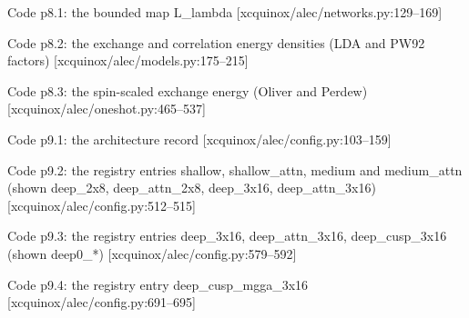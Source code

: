 \begin{frame}[allowframebreaks]{Code p8.1: the bounded map L\_lambda [xcquinox/alec/networks.py:129--169]}
\label{code:p8_1_the_bounded_map_l_lambda}
\end{frame}
\begin{frame}[allowframebreaks]{Code p8.2: the exchange and correlation energy densities (LDA and PW92 factors) [xcquinox/alec/models.py:175--215]}
\label{code:p8_2_the_exchange_and_correlation_energy_dens}
\end{frame}
\begin{frame}[allowframebreaks]{Code p8.3: the spin-scaled exchange energy (Oliver and Perdew) [xcquinox/alec/oneshot.py:465--537]}
\label{code:p8_3_the_spin_scaled_exchange_energy_oliver_a}
\end{frame}
\begin{frame}[allowframebreaks]{Code p9.1: the architecture record [xcquinox/alec/config.py:103--159]}
\label{code:p9_1_the_architecture_record}
\end{frame}
\begin{frame}[allowframebreaks]{Code p9.2: the registry entries shallow, shallow\_attn, medium and medium\_attn (shown deep\_2x8, deep\_attn\_2x8, deep\_3x16, deep\_attn\_3x16) [xcquinox/alec/config.py:512--515]}
\label{code:p9_2_the_registry_entries_shallow_shallow_att}
\end{frame}
\begin{frame}[allowframebreaks]{Code p9.3: the registry entries deep\_3x16, deep\_attn\_3x16, deep\_cusp\_3x16 (shown deep0\_*) [xcquinox/alec/config.py:579--592]}
\label{code:p9_3_the_registry_entries_deep_3x16_deep_attn}
\end{frame}
\begin{frame}[allowframebreaks]{Code p9.4: the registry entry deep\_cusp\_mgga\_3x16 [xcquinox/alec/config.py:691--695]}
\label{code:p9_4_the_registry_entry_deep_cusp_mgga_3x16}
\end{frame}
